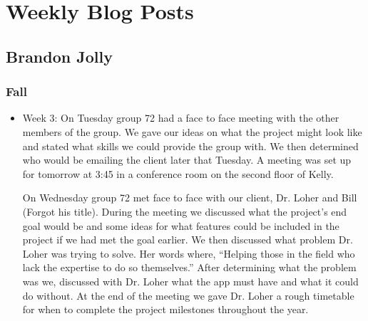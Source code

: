 \documentclass[onecolumn, draftclsnofoot,10pt, compsoc]{IEEEtran}
\begin{document}
 \section{Weekly Blog Posts}
 \subsection{Brandon Jolly}
 \subsubsection{Fall}
 \begin{itemize}
     \item Week 3: On Tuesday group 72 had a face to face meeting with the other members of the group. We gave our ideas on what the project might look like and stated what skills we could provide the group with. We then determined who would be emailing the client later that Tuesday. A meeting was set up for tomorrow at 3:45 in a conference room on the second floor of Kelly. 
     
     On Wednesday group 72 met face to face with our client, Dr. Loher and Bill (Forgot his title). During the meeting we discussed what the project’s end goal would be and some ideas for what features could be included in the project if we had met the goal earlier. We then discussed what problem Dr. Loher was trying to solve. Her words where, “Helping those in the field who lack the expertise to do so themselves.” After determining what the problem was we, discussed with Dr. Loher what the app must have and what it could do without. At the end of the meeting we gave Dr. Loher a rough timetable for when to complete the project milestones throughout the year.


\end{itemize}
\end{document}
